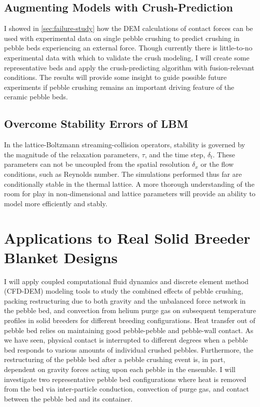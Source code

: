 \subsection{Augmenting Models with Crush-Prediction}
I showed in \cref{sec:failure-study} how the DEM calculations of contact forces can be used with experimental data on single pebble crushing to predict crushing in pebble beds experiencing an external force. Though currently there is little-to-no experimental data with which to validate the crush modeling, I will create some representative beds and apply the crush-predicting algorithm with fusion-relevant conditions. The results will provide some insight to guide possible future experiments if pebble crushing remains an important driving feature of the ceramic pebble beds.

\subsection{Overcome Stability Errors of LBM}
In the lattice-Boltzmann streaming-collision operators, stability is governed by the magnitude of the relaxation parameters, $\tau$, and the time step, $\delta_t$. These parameters can not be uncoupled from the spatial resolution $\delta_x$ or the flow conditions, such as Reynolds number. The simulations performed thus far are conditionally stable in the thermal lattice. A more thorough understanding of the room for play in non-dimensional and lattice parameters will provide an ability to model more efficiently and stably. 




\section{Applications to Real Solid Breeder Blanket Designs}\label{sec:applied-studies}

I will apply coupled computational fluid dynamics and discrete element method (CFD-DEM) modeling tools to study the combined effects of pebble crushing, packing restructuring due to both gravity and the unbalanced force network in the pebble bed, and convection from helium purge gas on subsequent temperature profiles in solid breeders for different breeding configurations. Heat transfer out of pebble bed relies on maintaining good pebble-pebble and pebble-wall contact. As we have seen, physical contact is interrupted to different degrees when a pebble bed responds to various amounts of individual crushed pebbles. Furthermore, the restructuring of the pebble bed after a pebble crushing event is, in part, dependent on gravity forces acting upon each pebble in the ensemble. I will investigate two representative pebble bed configurations where heat is removed from the bed via inter-particle conduction, convection of purge gas, and contact between the pebble bed and its container.

